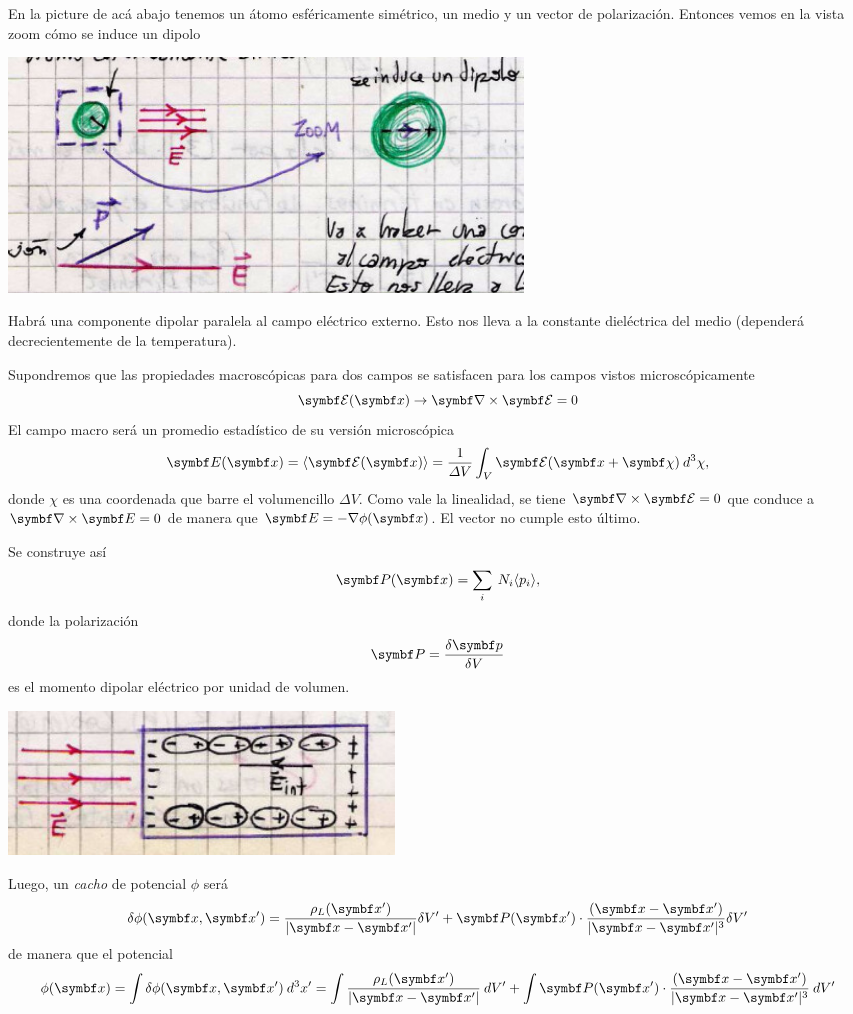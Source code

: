 \documentclass[10pt,oneside]{CBFT_book}
\begin{document}
En la picture de acá abajo tenemos un átomo esféricamente simétrico, un medio y un vector
de polarización. Entonces vemos en la vista zoom cómo se induce un dipolo

\includegraphics[width=0.6\textwidth]{images/fig_ft1_medios_campos_estaticos.jpg}

Habrá una componente dipolar paralela al campo eléctrico externo.
Esto nos lleva a la constante dieléctrica del medio (dependerá decrecientemente 
de la temperatura).

Supondremos que las propiedades macroscópicas para dos campos se satisfacen para los
campos vistos microscópicamente
\[
	\vb{\mathcal{E}}(\vbx) \to \rotorm{\mathcal{E}} = 0
\]
El campo macro  será un promedio estadístico de su versión microscópica
\[
	\vb{E}(\vbx) = \langle \vb{\mathcal{E}}(\vbx)  \rangle =
	\frac{1}{\Delta V} \int_V \vb{\mathcal{E}}( \vbx + \vb{\chi} ) \: d^3\chi,
\]
donde $\chi$ es una coordenada que barre el volumencillo $\Delta V$.
Como vale la linealidad, se tiene $ \rotorm{\mathcal{E}} = 0 $ que conduce a
$ \rotorm{ E } = 0 $ de manera que $ \vb{E} = - \nabla \phi(\vbx) $.
El vector  no cumple esto último.

Se construye así
\[
	\vb{P}(\vbx) = \sum_i \: N_i \langle p_i \rangle,
\]
donde la polarización  
\[
	\vb{P} = \frac{\delta \vb{p}}{\delta V}
\]
es el momento dipolar eléctrico por unidad de volumen. 

\includegraphics[width=0.45\textwidth]{images/fig_ft1_medios_picturete.jpg}	

Luego, un {\it cacho} de potencial $ \phi $ será
\[
	\delta \phi(\vbx,\vbx') = \frac{\rho_L(\vbx')}{|\vbx - \vbx'|} \delta V' +
	\vb{P}(\vbx')\cdot\frac{(\vbx - \vbx')}{|\vbx - \vbx'|^3} \delta V'
\]
de manera que el potencial
\[
	\phi(\vbx) = \int \delta \phi(\vbx,\vbx') \: d^3x' =
	\int \frac{\rho_L(\vbx')}{|\vbx - \vbx'|} \: dV' +
	\int \vb{P}(\vbx')\cdot\frac{(\vbx - \vbx')}{|\vbx - \vbx'|^3} \: dV'
\]
\end{document}

